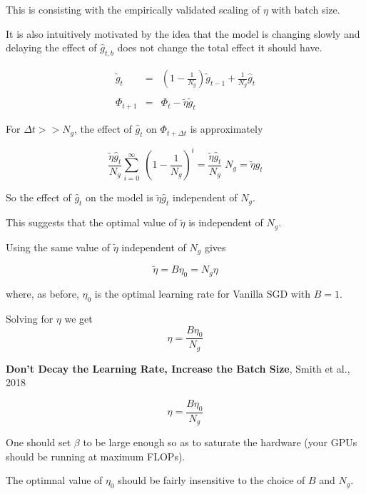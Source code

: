 {\vfill
This is consisting with the empirically validated scaling of $\eta$ with batch size.

\vfill
It is also intuitively motivated by the idea that the model is changing slowly and delaying the effect of $\hat{g}_{t,b}$ does not change the total effect it should have.


\begin{eqnarray*}
\tilde{g}_t & = & \left(1-\frac{1}{N_g}\right)\tilde{g}_{t-1} + \frac{1}{N_g} \hat{g}_t \\
\\
\Phi_{t+1} & = &  \Phi_t - \tilde{\eta}\tilde{g}_t
\end{eqnarray*}

For $\Delta t >> N_g$, the effect of $\hat{g}_t$ on $\Phi_{t+\Delta t}$ is approximately

$$\frac{\tilde{\eta}\hat{g}_t}{N_g}\sum_{i = 0}^\infty \;\left(1 - \frac{1}{N_g}\right)^i = \frac{\tilde{\eta}\hat{g}_t}{N_g}\;N_g = \tilde{\eta}\hat{g}_t$$

\vfill
{\color{red} So the effect of $\hat{g}_t$ on the model is $\tilde{\eta}\hat{g}_t$ independent of $N_g$.}

\vfill
This suggests that the optimal value of $\tilde{\eta}$ is independent of $N_g$.


Using the same value of $\tilde{\eta}$ independent of $N_g$ gives

$$\tilde{\eta} = B\eta_0 = N_g\eta$$

where, as before, $\eta_0$ is the optimal learning rate for Vanilla SGD with $B = 1$.

\vfill
Solving for $\eta$ we get
{\color{red} $$\eta = \frac{B\eta_0}{N_g}$$}

\vfill
{\bf Don't Decay the Learning Rate, Increase the Batch Size}, Smith et al., 2018


{\color{red} $$\eta = \frac{B\eta_0}{N_g}$$}


\vfill
One should set $\beta$ to be large enough so as to saturate the hardware (your GPUs should be running at maximum FLOPs).

\vfill
The optimnal value of $\eta_0$ should be fairly insensitive to the choice of $B$ and $N_g$.


}

